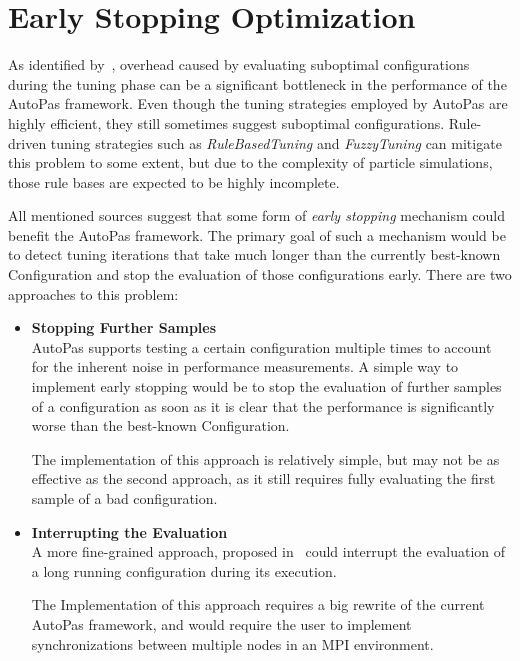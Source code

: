 \documentclass[conference]{IEEEtran}
\begin{document}
\newpage
\newpage


\section{Early Stopping Optimization}

As identified by~\cite{autopas_issue673}\cite{endreport.pdf}\cite{Manuel_Lerchner_Thesis.pdf}, overhead caused by evaluating suboptimal configurations during the tuning phase can be a significant bottleneck in the performance of the AutoPas framework. Even though the tuning strategies employed by AutoPas are highly efficient, they still sometimes suggest suboptimal configurations. Rule-driven tuning strategies such as \textit{RuleBasedTuning} and \textit{FuzzyTuning} can mitigate this problem to some extent, but due to the complexity of particle simulations, those rule bases are expected to be highly incomplete.

All mentioned sources suggest that some form of \textit{early stopping} mechanism could benefit the AutoPas framework. The primary goal of such a mechanism would be to detect tuning iterations that take much longer than the currently best-known Configuration and stop the evaluation of those configurations early. There are two approaches to this problem:

\begin{itemize}
    \item \textbf{Stopping Further Samples}\\
          AutoPas supports testing a certain configuration multiple times to account for the inherent noise in performance measurements. A simple way to implement early stopping would be to stop the evaluation of further samples of a configuration as soon as it is clear that the performance is significantly worse than the best-known Configuration.

          The implementation of this approach is relatively simple, but may not be as effective as the second approach, as it still requires fully evaluating the first sample of a bad configuration.
    \item \textbf{Interrupting the Evaluation}\\
          A more fine-grained approach, proposed in~\cite{endreport.pdf} could interrupt the evaluation of a long running configuration during its execution.

          The Implementation of this approach requires a big rewrite of the current AutoPas framework, and would require the user to implement synchronizations between multiple nodes in an MPI environment.
\end{itemize}
\end{document}
